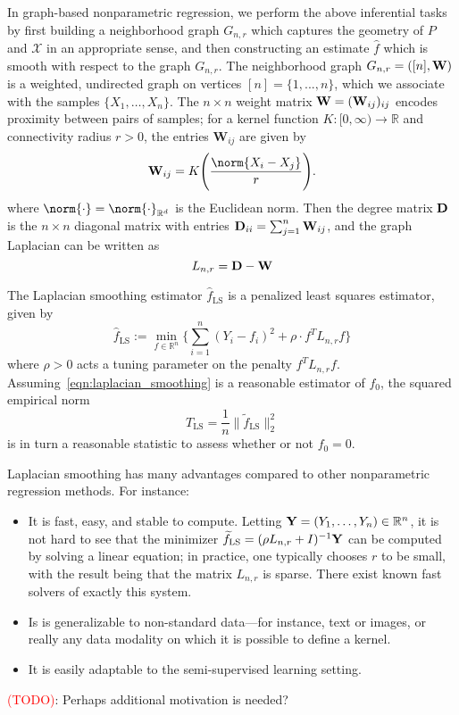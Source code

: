 \documentclass{article}
\newcommand{\Reals}{\mathbb{R}}
\newcommand{\1}{\mathbf{1}}
\newcommand{\Rd}{\Reals^d}
\newcommand{\Lap}{L}
\newcommand{\mc}[1]{\mathcal{#1}}
\newcommand{\wt}[1]{\widetilde{#1}}
\newcommand{\wh}[1]{\widehat{#1}}
\newcommand{\LS}{\mathrm{LS}}
\theoremstyle{alden}
\theoremstyle{aldenthm}
\theoremstyle{definition}
\theoremstyle{remark}
\begin{document}
In graph-based nonparametric regression, we perform the above inferential tasks by first building a neighborhood graph $G_{n,r}$ which captures the geometry of $P$ and $\mc{X}$ in an appropriate sense, and then constructing an estimate $\wh{f}$ which is smooth with respect to the graph $G_{n,r}$. The neighborhood graph $G_{n,r} = ([n],{\bf W})$ is a weighted, undirected graph on vertices $[n] = \{1,...,n\}$, which we associate with the samples $\{X_1,\ldots,X_n\}$. The $n \times n$ weight matrix ${\bf W} = ({\bf W}_{ij})_{ij}$ encodes proximity between pairs of samples; for a kernel function $K: [0,\infty) \to \Reals$ and connectivity radius $r > 0$, the entries $\mathbf{W}_{ij}$ are given by
\begin{equation*}
\label{eqn:neighborhood_graph}
{\bf W}_{ij} = K\Biggl(\frac{\norm{X_i - X_j}}{r}\Biggr).
\end{equation*}
where $\norm{\cdot} = \norm{\cdot}_{\Rd}$ is the Euclidean norm. Then the degree matrix ${\bf D}$ is the $n \times n$ diagonal matrix with entries ${\bf D}_{ii} = \sum_{j = 1}^{n}{\bf W}_{ij}$, and the graph Laplacian can be written as
\begin{equation}
\label{eqn:graph_Laplacian}
\Lap_{n,r} = \bf{D} - \bf{W}
\end{equation}

The Laplacian smoothing estimator $\wh{f}_{\LS}$ \citep{smola2003} is a penalized least squares estimator, given by
\begin{equation}
\label{eqn:laplacian_smoothing}
\wh{f}_{\LS} := \min_{f \in \Reals^n} \biggl\{\sum_{i = 1}^{n}(Y_i - f_i)^2 + \rho \cdot f^T \Lap_{n,r} f \biggr\}
\end{equation}
where $\rho > 0$ acts a tuning parameter on the penalty $f^T \Lap_{{n,r}} f$.
Assuming~\eqref{eqn:laplacian_smoothing} is a reasonable estimator of $f_0$, the squared empirical norm
\begin{equation}
T_{\LS} = \frac{1}{n}\bigl\|\wt{f}_{\LS}\bigr\|_2^2 \label{eqn:laplacian_smoothing_test}
\end{equation}
is in turn a reasonable statistic to assess whether or not $f_0 = 0$. 

Laplacian smoothing has many advantages compared to other nonparametric regression methods. For instance:
\begin{itemize}
	\item It is fast, easy, and stable to compute. Letting ${\bf Y} = (Y_1,\ldots,Y_n) \in \Reals^n$, it is not hard to see that the minimizer $\wt{f}_{\LS} = (\rho \Lap_{n,r} + I)^{-1}{\bf Y}$ can be computed by solving a linear equation; in practice, one typically chooses $r$ to be small, with the result being that the matrix $\Lap_{n,r}$ is sparse. There exist known fast solvers of exactly this system.
	\item Is is generalizable to non-standard data---for instance, text or images, or really any data modality on which it is possible to define a kernel.
	\item It is easily adaptable to the semi-supervised learning setting. 
\end{itemize}
\textcolor{red}{(TODO)}: Perhaps additional motivation is needed?
\end{document}

